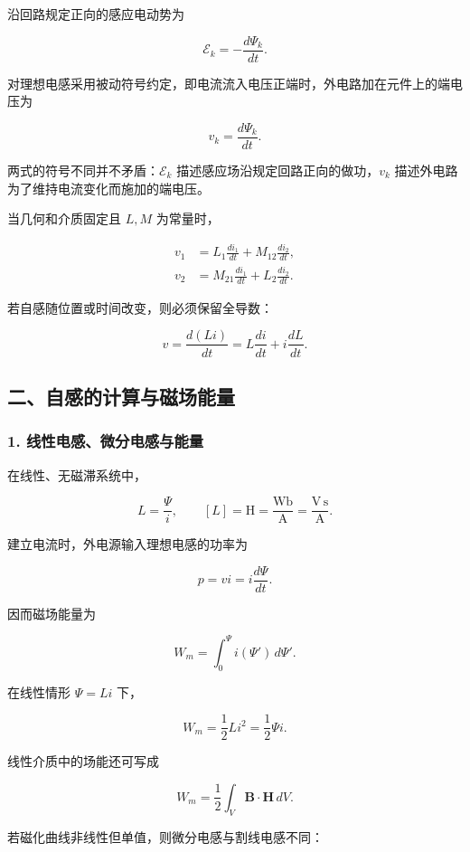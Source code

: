 沿回路规定正向的感应电动势为

\[
\boxed{\mathcal E_k=-\frac{d\Psi_k}{dt}}.
\]

对理想电感采用被动符号约定，即电流流入电压正端时，外电路加在元件上的端电压为

\[
\boxed{v_k=\frac{d\Psi_k}{dt}}.
\]

两式的符号不同并不矛盾：\(\mathcal E_k\)
描述感应场沿规定回路正向的做功，\(v_k\)
描述外电路为了维持电流变化而施加的端电压。

当几何和介质固定且 \(L,M\) 为常量时，

\[
\begin{aligned}
v_1&=L_1\frac{di_1}{dt}+M_{12}\frac{di_2}{dt},\\
v_2&=M_{21}\frac{di_1}{dt}+L_2\frac{di_2}{dt}.
\end{aligned}
\]

若自感随位置或时间改变，则必须保留全导数：

\[
v=\frac{d(Li)}{dt}=L\frac{di}{dt}+i\frac{dL}{dt}.
\]

\subsection{二、自感的计算与磁场能量}\label{m5:ux4e8cux81eaux611fux7684ux8ba1ux7b97ux4e0eux78c1ux573aux80fdux91cf}

\subsubsection{1.
线性电感、微分电感与能量}\label{m5:ux7ebfux6027ux7535ux611fux5faeux5206ux7535ux611fux4e0eux80fdux91cf}

在线性、无磁滞系统中，

\[
\boxed{L=\frac{\Psi}{i}},
\qquad
[L]=\mathrm{H}=\frac{\mathrm{Wb}}{\mathrm A}
=\frac{\mathrm{V\,s}}{\mathrm A}.
\]

建立电流时，外电源输入理想电感的功率为

\[
p=vi=i\frac{d\Psi}{dt}.
\]

因而磁场能量为

\[
W_m=\int_0^{\Psi} i(\Psi')\,d\Psi'.
\]

在线性情形 \(\Psi=Li\) 下，

\[
\boxed{W_m=\frac12Li^2=\frac12\Psi i}.
\]

线性介质中的场能还可写成

\[
\boxed{W_m=\frac12\int_V\mathbf B\cdot\mathbf H\,dV}.
\]

若磁化曲线非线性但单值，则微分电感与割线电感不同：

